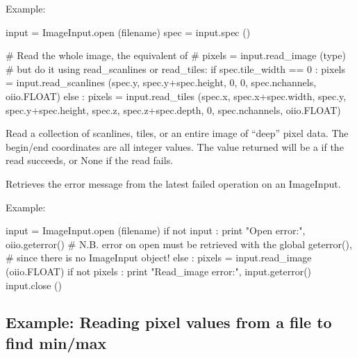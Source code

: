 \noindent Example:
\begin{code}
    input = ImageInput.open (filename)
    spec = input.spec ()

    # Read the whole image, the equivalent of
    #     pixels = input.read_image (type)
    # but do it using read_scanlines or read_tiles:
    if spec.tile_width == 0 :
        pixels = input.read_scanlines (spec.y, spec.y+spec.height, 0,
                                       0, spec.nchannels, oiio.FLOAT)
    else :
        pixels = input.read_tiles (spec.x, spec.x+spec.width,
                                   spec.y, spec.y+spec.height,
                                   spec.z, spec.z+spec.depth,
                                   0, spec.nchannels, oiio.FLOAT)
\end{code}
\apiend


Read a collection of scanlines, tiles, or an entire image of ``deep'' pixel
data. The begin/end coordinates are all integer values. The value returned
will be a \DeepData if the read succeeds, or {\cf None} if the read fails.
\apiend

Retrieves the error message from the latest failed operation on an
ImageInput.

\noindent Example:
\begin{code}
    input = ImageInput.open (filename)
    if not input :
        print "Open error:", oiio.geterror()
        # N.B. error on open must be retrieved with the global geterror(),
        # since there is no ImageInput object!
    else :
        pixels = input.read_image (oiio.FLOAT)
        if not pixels :
            print "Read_image error:", input.geterror()
        input.close ()
\end{code}
\apiend

\newpage
\subsection*{Example: Reading pixel values from a file to find min/max}

